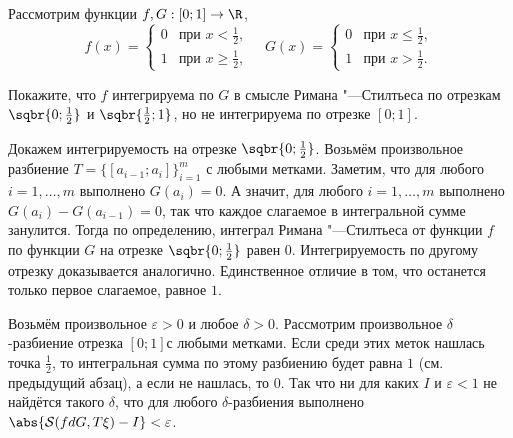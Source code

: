 \begin{problem}[33$^\circ$]
    Рассмотрим функции $f, G: [0; 1] \to \R$,
    \[
        f(x) =
        \begin{cases}
            0&\text{при $x < \frac{1}{2}$},\\
            1&\text{при $x \geqslant \frac{1}{2}$},
        \end{cases}\quad
        G(x) =
        \begin{cases}
            0&\text{при $x \leqslant \frac{1}{2}$},\\
            1&\text{при $x > \frac{1}{2}$}.
        \end{cases}
    \]

    Покажите, что $f$ интегрируема по $G$ в смысле Римана "---Стилтьеса по отрезкам $\sqbr{0; \frac{1}{2}}$ и $\sqbr{\frac{1}{2}; 1}$, но не интегрируема по отрезке $[0; 1]$.
\end{problem}

\begin{solution}
    Докажем интегрируемость на отрезке $\sqbr{0; \frac{1}{2}}$. Возьмём произвольное разбиение $T = \{[a_{i - 1}; a_i]\}_{i = 1}^m$ с любыми метками. Заметим, что для любого $i = 1, \ldots, m$ выполнено $G(a_i) = 0$. А значит, для любого $i = 1, \ldots, m$ выполнено $G(a_i) - G(a_{i - 1}) = 0$, так что каждое слагаемое в интегральной сумме занулится. Тогда по определению, интеграл Римана "---Стилтьеса от функции $f$ по функции $G$ на отрезке $\sqbr{0; \frac{1}{2}}$ равен $0$. Интегрируемость по другому отрезку доказывается аналогично. Единственное отличие в том, что останется только первое слагаемое, равное $1$.

    Возьмём произвольное $\varepsilon > 0$ и любое $\delta > 0$. Рассмотрим произвольное $\delta$-разбиение отрезка $[0; 1]$с любыми метками. Если среди этих меток нашлась точка $\frac{1}{2}$, то интегральная сумма по этому разбиению будет равна $1$ (см. предыдущий абзац), а если не нашлась, то $0$. Так что ни для каких $I$ и $\varepsilon < 1$ не найдётся такого $\delta$, что для любого $\delta$-разбиения выполнено $\abs{\mathcal{S}(fdG, T\xi) - I} < \varepsilon$.
\end{solution}

